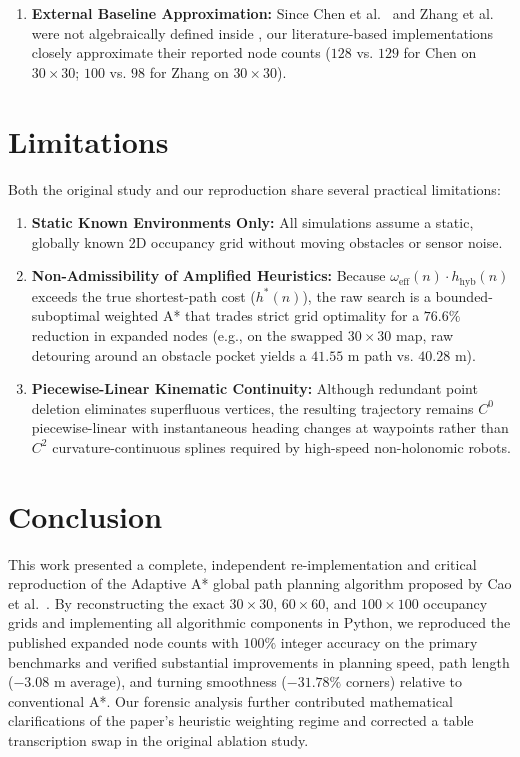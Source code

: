 \documentclass[conference]{IEEEtran}
\begin{document}
\begin{enumerate}
\begin{enumerate}
    \item \textbf{External Baseline Approximation:} Since Chen et al.~\cite{chen2023improved} and Zhang et al.~\cite{zhang2023global} were not algebraically defined inside \cite{cao2026adaptive}, our literature-based implementations closely approximate their reported node counts ($128$ vs. $129$ for Chen on $30\times 30$; $100$ vs. $98$ for Zhang on $30\times 30$).
\end{enumerate}

\section{Limitations}
Both the original study \cite{cao2026adaptive} and our reproduction share several practical limitations:
\begin{enumerate}
    \item \textbf{Static Known Environments Only:} All simulations assume a static, globally known 2D occupancy grid without moving obstacles or sensor noise.
    \item \textbf{Non-Admissibility of Amplified Heuristics:} Because $\omega_{\text{eff}}(n) \cdot h_{\text{hyb}}(n)$ exceeds the true shortest-path cost ($h^*(n)$), the raw search is a bounded-suboptimal weighted A* that trades strict grid optimality for a $76.6\%$ reduction in expanded nodes (e.g., on the swapped $30 \times 30$ map, raw detouring around an obstacle pocket yields a $41.55\text{ m}$ path vs. $40.28\text{ m}$).
    \item \textbf{Piecewise-Linear Kinematic Continuity:} Although redundant point deletion eliminates superfluous vertices, the resulting trajectory remains $C^0$ piecewise-linear with instantaneous heading changes at waypoints rather than $C^2$ curvature-continuous splines required by high-speed non-holonomic robots.
\end{enumerate}

\section{Conclusion}
This work presented a complete, independent re-implementation and critical reproduction of the Adaptive A* global path planning algorithm proposed by Cao et al.~\cite{cao2026adaptive}. By reconstructing the exact $30 \times 30$, $60 \times 60$, and $100 \times 100$ occupancy grids and implementing all algorithmic components in Python, we reproduced the published expanded node counts with $100\%$ integer accuracy on the primary benchmarks and verified substantial improvements in planning speed, path length ($-3.08\text{ m}$ average), and turning smoothness ($-31.78\%$ corners) relative to conventional A*. Our forensic analysis further contributed mathematical clarifications of the paper's heuristic weighting regime and corrected a table transcription swap in the original ablation study.


\end{enumerate}
\end{document}
